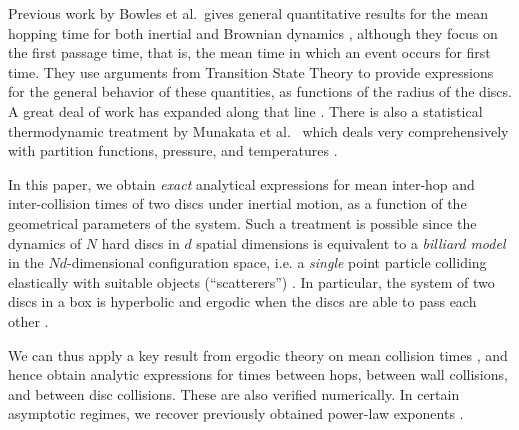 \documentclass[superscriptaddress,pre,reprint,showpacs,onecolumn]{revtex4-1}
\newcommand{\etal}{et al.\ }
\begin{document}
Previous work
by Bowles \etal gives general quantitative results for the mean hopping 
time for both inertial and Brownian dynamics \cite{Bowles04}, although they focus
on the first passage time, that is, the mean time in which an event
occurs for first time. 
They use arguments from Transition State Theory 
to provide expressions for the general behavior of these quantities, as functions of the
radius of the discs. %
A great deal of work has expanded along that line  \cite{Suh05, Ball09}.
There is also a statistical thermodynamic treatment by Munakata \etal 
which deals very comprehensively with partition functions, pressure,
and temperatures \cite{Munakata02, Munakata06}. 


In this paper, we obtain \emph{exact} analytical expressions for mean inter-hop and inter-collision times of two discs under 
inertial motion, as a function of the geometrical parameters of the system. Such a treatment is possible
 since the dynamics of $N$ hard discs in $d$ spatial dimensions
 is equivalent to a \emph{billiard model} in the $Nd$-dimensional configuration space, i.e. a \emph{single} point particle colliding elastically 
with suitable objects (``scatterers'') \cite{SzaszBook00}. 
In particular, the system of two discs in a box is hyperbolic and ergodic when the discs are able to pass each other \cite{Sim99}. 

We can thus apply a key result from ergodic theory on mean collision times \cite{Chernov97}, and hence obtain analytic expressions 
for times between hops, between wall collisions, and between disc collisions. These are also verified numerically. 
In certain asymptotic regimes, we recover previously obtained power-law exponents \cite{Bowles04}.


\end{document}

